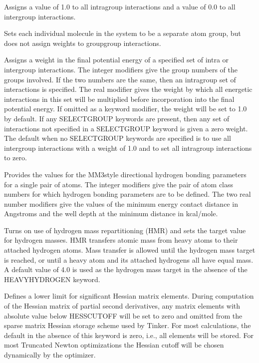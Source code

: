 \documentclass[letterpaper,11pt,english]{sphinxmanual}
\begin{document}
  Assigns a value of 1.0 to all intra\sphinxhyphen{}group interactions and a value of 0.0 to all inter\sphinxhyphen{}group interactions.

  Sets each individual molecule in the system to be a separate atom group, but does not assign weights to group\sphinxhyphen{}group interactions.

  Assigns a weight in the final potential energy of a specified set of intra\sphinxhyphen{} or intergroup interactions. The integer modifiers give the group numbers of the groups involved. If the two numbers are the same, then an intragroup set of interactions is specified. The real modifier gives the weight by which all energetic interactions in this set will be multiplied before incorporation into the final potential energy. If omitted as a keyword modifier, the weight will be set to 1.0 by default. If any SELECT\sphinxhyphen{}GROUP keywords are present, then any set of interactions not specified in a SELECT\sphinxhyphen{}GROUP keyword is given a zero weight. The default when no SELECT\sphinxhyphen{}GROUP keywords are specified is to use all intergroup interactions with a weight of 1.0 and to set all intragroup interactions to zero.

  Provides the values for the MM3\sphinxhyphen{}style directional hydrogen bonding parameters for a single pair of atoms. The integer modifiers give the pair of atom class numbers for which hydrogen bonding parameters are to be defined. The two real number modifiers give the values of the minimum energy contact distance in Angstroms and the well depth at the minimum distance in kcal/mole.

  Turns on use of hydrogen mass repartitioning (HMR) and sets the target value for hydrogen masses. HMR transfers atomic mass from heavy atoms to their attached hydrogen atoms. Mass transfer is allowed until the hydrogen mass target is reached, or until a heavy atom and its attached hydrogens all have equal mass. A default value of 4.0 is used as the hydrogen mass target in the absence of the HEAVY\sphinxhyphen{}HYDROGEN keyword.

  Defines a lower limit for significant Hessian matrix elements. During computation of the Hessian matrix of partial second derivatives, any matrix elements with absolute value below HESS\sphinxhyphen{}CUTOFF will be set to zero and omitted from the sparse matrix Hessian storage scheme used by Tinker. For most calculations, the default in the absence of this keyword is zero, i.e., all elements will be stored. For most Truncated Newton optimizations the Hessian cutoff will be chosen dynamically by the optimizer.
\end{document}

